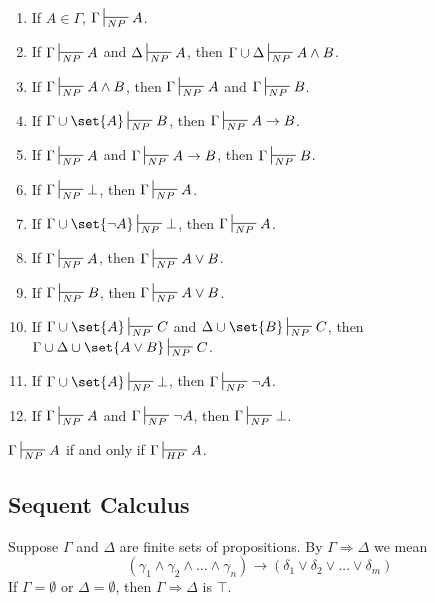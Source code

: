 \begin{lemma}
    \begin{enumerate}
        \item If \(A \in \Gamma\), \(\Gamma \sststile{NP}{} A\).
        \item If \(\Gamma \sststile{NP}{} A\) and \(\Delta \sststile{NP}{} A\), then \(\Gamma \cup \Delta \sststile{NP}{} A \land B\).
        \item If \(\Gamma \sststile{NP}{} A \land B\), then \(\Gamma \sststile{NP}{} A\) and \(\Gamma \sststile{NP}{} B\).
        \item If \(\Gamma \cup \set{A} \sststile{NP}{} B \), then \(\Gamma \sststile{NP}{} A \to B\).
        \item If \(\Gamma \sststile{NP}{} A\) and \(\Gamma \sststile{NP}{} A \to B\), then \(\Gamma \sststile{NP}{} B\).
        \item If \(\Gamma \sststile{NP}{} \bot\), then \(\Gamma \sststile{NP}{} A\).
        \item If \(\Gamma \cup \set{\neg A} \sststile{NP}{} \bot\), then \(\Gamma \sststile{NP}{} A\).
        \item If \(\Gamma \sststile{NP}{} A\), then \(\Gamma \sststile{NP}{} A \lor B\).
        \item If \(\Gamma \sststile{NP}{} B\), then \(\Gamma \sststile{NP}{} A \lor B\).
        \item If \(\Gamma \cup \set{A} \sststile{NP}{} C\) and \(\Delta \cup \set{B} \sststile{NP}{} C\), then \(\Gamma \cup \Delta \cup \set{A \lor B} \sststile{NP}{} C\).
        \item If \(\Gamma \cup \set{A} \sststile{NP}{} \bot\), then \(\Gamma \sststile{NP}{} \neg A\).
        \item If \(\Gamma \sststile{NP}{} A\) and \(\Gamma \sststile{NP}{} \neg A\), then \(\Gamma \sststile{NP}{} \bot\).
    \end{enumerate}
\end{lemma}
 
\begin{theorem}
    \(\Gamma \sststile{NP}{} A\) if and only if \(\Gamma \sststile{HP}{} A\).
\end{theorem}

\subsection{Sequent Calculus}
Suppose \(\Gamma\) and \(\Delta\) are finite sets of propositions. By \(\Gamma \Rightarrow \Delta\) we mean 
\begin{equation}
   ( \gamma_1 \land \gamma_2 \land \dots \land \gamma_n) \to (\delta_1 \lor \delta_2 \lor \dots \lor \delta_m)
\end{equation}
If \(\Gamma = \emptyset\) or \(\Delta = \emptyset\), then \(\Gamma \Rightarrow \Delta\) is \(\top\).

